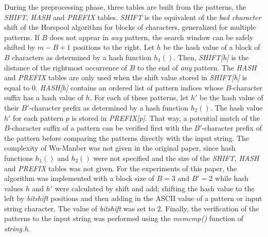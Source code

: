 \documentclass{ws-ijait}
\begin{document}
During the preprocessing phase, three tables are built from the patterns, the \textit{SHIFT}, \textit{HASH} and \textit{PREFIX} tables. \textit{SHIFT} is the equivalent of the \textit{bad character} shift of the Horspool algorithm for blocks of characters, generalized for multiple patterns. If $B$ does not appear in \textit{any} pattern, the search window can be safely shifted by $m - B + 1$ positions to the right. Let $h$ be the hash value of a block of $B$ characters as determined by a hash function $h_1()$. Then, \textit{SHIFT[h]} is the distance of the rightmost occurrence of $B$ to the end of \textit{any} pattern. The \textit{HASH} and \textit{PREFIX} tables are only used when the shift value stored in \textit{SHIFT[h]} is equal to $0$. \textit{HASH[h]} contains an ordered list of pattern indices whose $B$-character suffix has a hash value of $h$. For each of these patterns, let $h'$ be the hash value of their $B'$-character prefix as determined by a hash function $h_2()$. The hash value $h'$ for each pattern $p$ is stored in \textit{PREFIX[p]}. That way, a potential match of the $B$-character suffix of a pattern can be verified first with the $B'$-character prefix of the pattern before comparing the patterns directly with the input string. The complexity of Wu-Manber was not given in the original paper, since hash functions $h_1()$ and $h_2()$ were not specified and the size of the \textit{SHIFT}, \textit{HASH} and \textit{PREFIX} tables was not given.\cite{Navarro2002} For the experiments of this paper, the algorithm was implemented with a block size of $B = 3$ and $B' = 2$ while hash values $h$ and $h'$ were calculated by shift and add; shifting the hash value to the left by \textit{bitshift} positions and then adding in the ASCII value of a pattern or input string character. The value of \textit{bitshift} was set to $2$. Finally, the verification of the patterns to the input string was performed using the \textit{memcmp()} function of \textit{string.h}.
\end{document}
